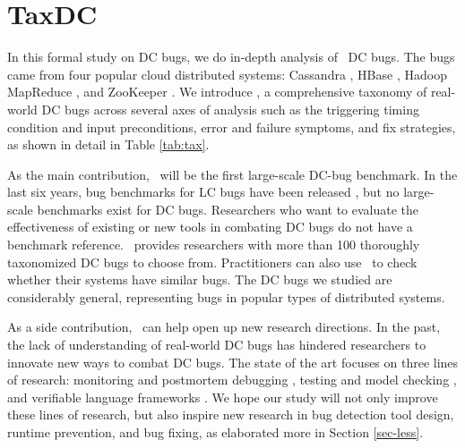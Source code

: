 
\section{TaxDC}
\label{sec-taxdc}

In this formal study on DC bugs, we do in-depth analysis of \numDcBugs\ DC
bugs.  The bugs came from four popular cloud distributed systems: Cassandra
\cite{CassandraWeb}, HBase \cite{HBaseWeb}, Hadoop MapReduce \cite{HadoopWeb},
and ZooKeeper \cite{ZooKeeperWeb}.
%
We introduce \taxdc, a comprehensive taxonomy of real-world DC bugs across
several axes of analysis such as the triggering timing condition and input
preconditions, error and failure symptoms, and fix strategies, as shown in
detail in Table \ref{tab:tax}.

As the main contribution, \tdc\ will be the first large-scale DC-bug benchmark.
In the last six years, bug benchmarks for LC bugs have been released
\cite{Jalbert11-RADBench, jieyu}, but no large-scale benchmarks exist for DC
bugs.  Researchers who want to evaluate the effectiveness of existing or new
tools in combating DC bugs do not have a benchmark reference.  \tdc\ provides
researchers with more than 100 thoroughly taxonomized DC bugs to choose from.
Practitioners can also use \tdc\ to check whether their systems have similar
bugs.  The DC bugs we studied are considerably general, representing bugs in
popular types of distributed systems.

As a side contribution, \tdc\ can help open up new research directions. In the
past, the lack of understanding of real-world DC bugs has hindered researchers
to innovate new ways to combat DC bugs.  The state of the art focuses on three
lines of research: monitoring and postmortem debugging \cite{Geels+07-Friday,
Liu+08-D3S, Liu+07-WiDS, Reynolds+06-Pip}, testing and model checking
\cite{Guo+11-Demeter, Killian+07-LifeDeathMaceMC, Leesatapornwongsa+14-Samc,
Simsa+10-Dbug, Yang+09-Modist}, and verifiable language frameworks
\cite{Desai+13-PLang, Wilcox+15-Verdi}.  We hope our study will not only improve
these lines of research, but also inspire new research in bug detection tool
design, runtime prevention, and bug fixing, as elaborated more in Section
\ref{sec-less}.

